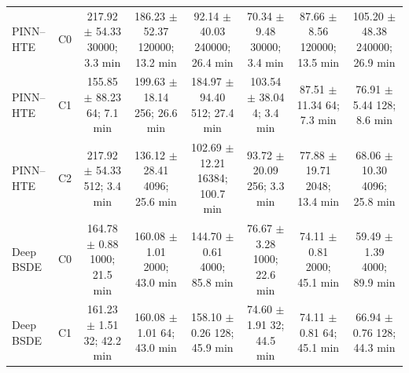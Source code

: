 \begin{table}[t]
\begin{tabular}{llcccccc}
\addlinespace
PINN--HTE & C0 & \shortstack{217.92 $\pm$ 54.33\\30000; 3.3 min} & \shortstack{186.23 $\pm$ 52.37\\120000; 13.2 min} & \shortstack{92.14 $\pm$ 40.03\\240000; 26.4 min} & \shortstack{70.34 $\pm$ 9.48\\30000; 3.4 min} & \shortstack{87.66 $\pm$ 8.56\\120000; 13.5 min} & \shortstack{105.20 $\pm$ 48.38\\240000; 26.9 min} \\
PINN--HTE & C1 & \shortstack{155.85 $\pm$ 88.23\\64; 7.1 min} & \shortstack{199.63 $\pm$ 18.14\\256; 26.6 min} & \shortstack{184.97 $\pm$ 94.40\\512; 27.4 min} & \shortstack{103.54 $\pm$ 38.04\\4; 3.4 min} & \shortstack{87.51 $\pm$ 11.34\\64; 7.3 min} & \shortstack{76.91 $\pm$ 5.44\\128; 8.6 min} \\
PINN--HTE & C2 & \shortstack{217.92 $\pm$ 54.33\\512; 3.4 min} & \shortstack{136.12 $\pm$ 28.41\\4096; 25.6 min} & \shortstack{102.69 $\pm$ 12.21\\16384; 100.7 min} & \shortstack{93.72 $\pm$ 20.09\\256; 3.3 min} & \shortstack{77.88 $\pm$ 19.71\\2048; 13.4 min} & \shortstack{68.06 $\pm$ 10.30\\4096; 25.8 min} \\
\addlinespace
Deep BSDE & C0 & \shortstack{164.78 $\pm$ 0.88\\1000; 21.5 min} & \shortstack{160.08 $\pm$ 1.01\\2000; 43.0 min} & \shortstack{144.70 $\pm$ 0.61\\4000; 85.8 min} & \shortstack{76.67 $\pm$ 3.28\\1000; 22.6 min} & \shortstack{74.11 $\pm$ 0.81\\2000; 45.1 min} & \shortstack{59.49 $\pm$ 1.39\\4000; 89.9 min} \\
Deep BSDE & C1 & \shortstack{161.23 $\pm$ 1.51\\32; 42.2 min} & \shortstack{160.08 $\pm$ 1.01\\64; 43.0 min} & \shortstack{158.10 $\pm$ 0.26\\128; 45.9 min} & \shortstack{74.60 $\pm$ 1.91\\32; 44.5 min} & \shortstack{74.11 $\pm$ 0.81\\64; 45.1 min} & \shortstack{66.94 $\pm$ 0.76\\128; 44.3 min} \\

\end{tabular}
\end{table}
